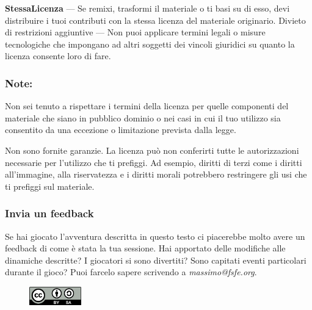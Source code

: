\documentclass[letterpaper,twocolumn,openany,nodeprecatedcode]{dndbook}
\begin{document}
    \textbf{StessaLicenza} — Se remixi, trasformi il materiale o ti basi su di esso, devi distribuire i tuoi contributi con la stessa licenza del materiale originario.
    Divieto di restrizioni aggiuntive — Non puoi applicare termini legali o misure tecnologiche che impongano ad altri soggetti dei vincoli giuridici su quanto la licenza consente loro di fare.

\subsubsection{Note:}

Non sei tenuto a rispettare i termini della licenza per quelle componenti del materiale che siano in pubblico dominio o nei casi in cui il tuo utilizzo sia consentito da una eccezione o limitazione prevista dalla legge.

Non sono fornite garanzie. La licenza può non conferirti tutte le autorizzazioni necessarie per l'utilizzo che ti prefiggi. Ad esempio, diritti di terzi come i diritti all'immagine, alla riservatezza e i diritti morali potrebbero restringere gli usi che ti prefiggi sul materiale.

\subsubsection{Invia un feedback}
Se hai giocato l'avventura descritta in questo testo ci piacerebbe molto avere un feedback di come è stata la tua sessione. Hai apportato delle modifiche alle dinamiche descritte? I giocatori si sono divertiti? Sono capitati eventi particolari durante il gioco? Puoi farcelo sapere scrivendo a \textit{massimo@fsfe.org}.

\begin{figure}
\centering
\includegraphics[width=0.2\textwidth]{img/by-sa.png}
\end{figure}

{}

\end{document}
